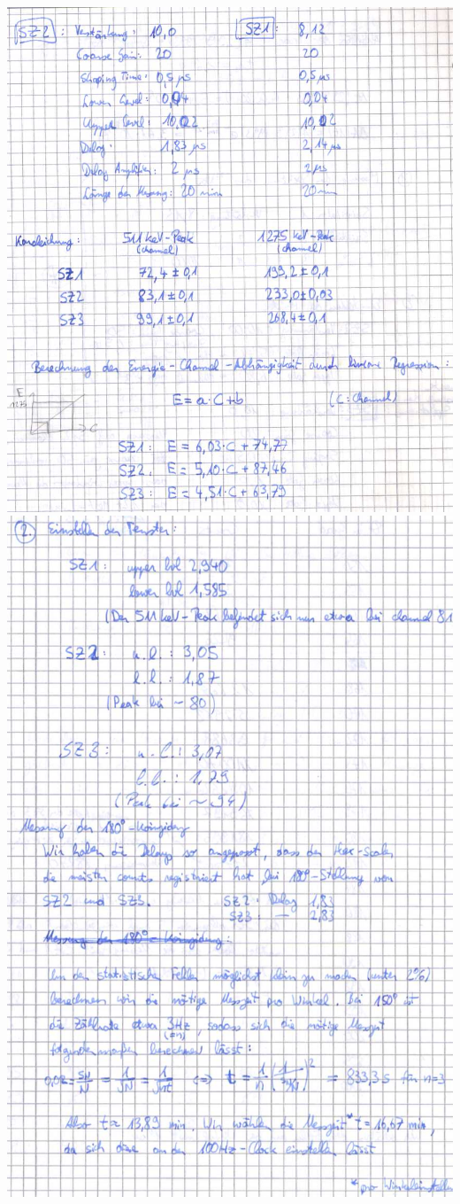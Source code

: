 \clearpage
\includegraphics[scale=0.55]{Messprotokoll/0004.jpeg}
\clearpage
\includegraphics[scale=0.55]{Messprotokoll/0005.jpeg}
